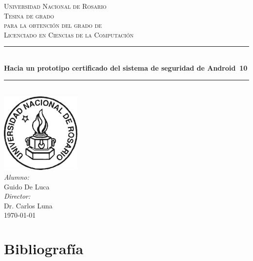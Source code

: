 \documentclass[a4paper]{book}
\begin{document}
\begin{titlepage}

    \newcommand{\HRule}{\rule{\linewidth}{0.5mm}}  %

    \center

    \textsc{\LARGE Universidad Nacional de Rosario} \\[1cm]

    \textsc{\Large Tesina de grado}\\[0.1cm]
    \textsc{\large para la obtención del grado de}\\[0.1cm]
    \textsc{\large Licenciado en Ciencias de la Computación}\\[1cm]

    \HRule \\[0.8cm]
    {\Large \bfseries Hacia un prototipo certificado del sistema de seguridad de
    Android~10 }\\[0.7cm]        %
    \HRule \\[2cm]


    \large
    \includegraphics[width=0.3\textwidth]{imagenes/unr.jpg}\\[3cm] 	%
    \emph{Alumno:}\\
    Guido De Luca \\[0.5cm]
    \emph{Director:}\\
    Dr. Carlos Luna\\[1.5cm]
    {\large \today}\\[2cm]
    \vfill
\end{titlepage}

\tableofcontents










\chapter*{Bibliografía}
\label{chapter:bib}
\printbibliography[heading=none]
\end{document}
